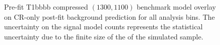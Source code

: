 \begin{figure}[!h]
{        \label{fig:T1bbbb_compressed_MR_4j}
    } \\
     ~~
     \\
    \caption{
        Pre-fit T1bbbb compressed $(1300,1100)$ benchmark model overlay on
        CR-only post-fit background prediction for all analysis bins. The
        uncertainty on the signal model counts represents the statistical
        uncertainty due to the finite size of the of the simulated sample.
    }
    \label{fig:T1bbbb_compressed_MR}
\end{figure}


